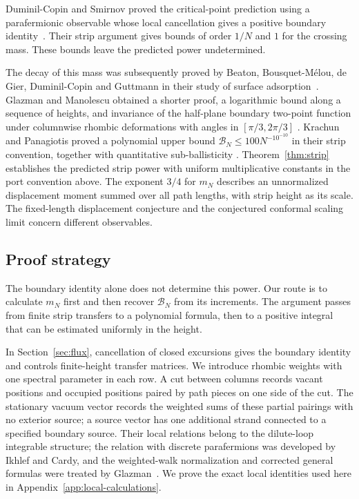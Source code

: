Duminil-Copin and Smirnov proved the critical-point prediction using
a parafermionic observable whose local cancellation gives a positive
boundary identity~\cite[Lemmas~1 and~2]{DCS2012}.
Their strip argument gives bounds of order $1/N$ and $1$ for the
crossing mass. These bounds leave the predicted power undetermined.

The decay of this mass was subsequently proved by Beaton,
Bousquet-M\'elou, de Gier, Duminil-Copin and Guttmann in their study of
surface adsorption~\cite[Theorem~10]{BeatonEtAl2014}.
Glazman and Manolescu obtained a shorter proof, a logarithmic bound
along a sequence of heights, and invariance of the half-plane boundary
two-point function under columnwise rhombic deformations with angles
in $[\pi/3,2\pi/3]$
\cite[Proposition~1.1 and Theorems~1--2]{GM2019}.
Krachun and Panagiotis proved a polynomial upper bound
$\mathcal B_N\le100N^{-10^{-10}}$ in their strip convention,
together with quantitative sub-ballisticity
\cite[Theorems~1--2]{KrachunPanagiotis2026}.
Theorem~\ref{thm:strip} establishes the predicted strip power with
uniform multiplicative constants in the port convention above.
The exponent $3/4$ for $m_N$ describes an unnormalized displacement
moment summed over all path lengths, with strip height as its scale.
The fixed-length displacement conjecture and the conjectured conformal
scaling limit concern different observables.

\subsection{Proof strategy}
The boundary identity alone does not determine this power. Our route
is to calculate $m_N$ first and then recover $\mathcal B_N$ from its
increments. The argument passes from finite strip transfers to a
polynomial formula, then to a positive integral that can be estimated
uniformly in the height.

In Section~\ref{sec:flux}, cancellation of closed excursions gives the
boundary identity and controls finite-height transfer matrices. We
introduce rhombic weights with one spectral parameter in each row.
A cut between columns records vacant positions and occupied positions paired
by path pieces on one side of the cut. The stationary vacuum vector
records the weighted sums of these partial pairings with no exterior
source; a source vector has one additional strand connected to a
specified boundary source.
Their local relations belong to the dilute-loop integrable structure;
the relation with discrete parafermions was developed by Ikhlef and
Cardy, and the weighted-walk normalization and corrected general
formulas were treated by Glazman~\cite{IkhlefCardy2009,Glazman2015}.
We prove the exact local identities used here in
Appendix~\ref{app:local-calculations}.

